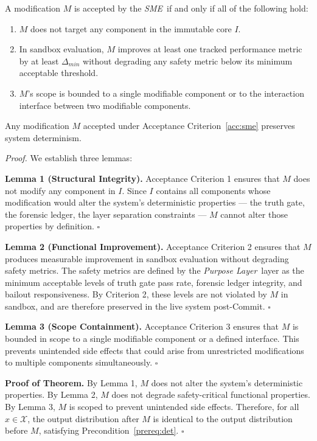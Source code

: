 \documentclass[12pt]{article}
\newcommand{\purpose}{\textit{Purpose Layer}}
\newcommand{\sme}{\textit{SME}}
\begin{document}
\begin{acceptance}
\label{acc:sme}
A modification $M$ is accepted by the \sme\ if and only if all of the following hold:
\begin{enumerate}
    \item $M$ does not target any component in the immutable core $I$.
    \item In sandbox evaluation, $M$ improves at least one tracked performance metric by at least $\Delta_{min}$ without degrading any safety metric below its minimum acceptable threshold.
    \item $M$'s scope is bounded to a single modifiable component or to the interaction interface between two modifiable components.
\end{enumerate}
\end{acceptance}

\begin{mainthm}
\label{mainthm:det-pres}
Any modification $M$ accepted under Acceptance Criterion~\ref{acc:sme} preserves system determinism.
\end{mainthm}

\textit{Proof.} We establish three lemmas:

\textbf{Lemma 1 (Structural Integrity).} Acceptance Criterion 1 ensures that $M$ does not modify any component in $I$. Since $I$ contains all components whose modification would alter the system's deterministic properties — the truth gate, the forensic ledger, the layer separation constraints — $M$ cannot alter those properties by definition. $\square$

\textbf{Lemma 2 (Functional Improvement).} Acceptance Criterion 2 ensures that $M$ produces measurable improvement in sandbox evaluation without degrading safety metrics. The safety metrics are defined by the \purpose\ layer as the minimum acceptable levels of truth gate pass rate, forensic ledger integrity, and bailout responsiveness. By Criterion 2, these levels are not violated by $M$ in sandbox, and are therefore preserved in the live system post-Commit. $\square$

\textbf{Lemma 3 (Scope Containment).} Acceptance Criterion 3 ensures that $M$ is bounded in scope to a single modifiable component or a defined interface. This prevents unintended side effects that could arise from unrestricted modifications to multiple components simultaneously. $\square$

\textbf{Proof of Theorem.} By Lemma 1, $M$ does not alter the system's deterministic properties. By Lemma 2, $M$ does not degrade safety-critical functional properties. By Lemma 3, $M$ is scoped to prevent unintended side effects. Therefore, for all $x \in \mathcal{X}$, the output distribution after $M$ is identical to the output distribution before $M$, satisfying Precondition~\ref{prereq:det}. $\square$
\end{document}
